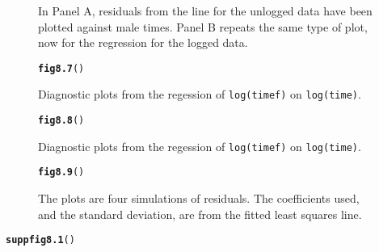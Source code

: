\documentclass[12pt, a4paper,  BCOR=8.25mm, DIV=15]{scrartcl}\usepackage[]{graphicx}\usepackage[]{color}
\makeatletter
\newcommand{\hlstd}[1]{\textcolor[rgb]{0.345,0.345,0.345}{#1}}%
\newcommand{\hlkwd}[1]{\textcolor[rgb]{0.737,0.353,0.396}{\textbf{#1}}}%
\newenvironment{kframe}{%
 \def\at@end@of@kframe{}%
 \ifinner\ifhmode%
  \def\at@end@of@kframe{\end{minipage}}%
  \begin{minipage}{\columnwidth}%
 \fi\fi%
 \def\FrameCommand##1{\hskip\@totalleftmargin \hskip-\fboxsep
 \colorbox{shadecolor}{##1}\hskip-\fboxsep
     \hskip-\linewidth \hskip-\@totalleftmargin \hskip\columnwidth}%
 \MakeFramed {\advance\hsize-\width
   \@totalleftmargin\z@ \linewidth\hsize
   \@setminipage}}%
 {\par\unskip\endMakeFramed%
 \at@end@of@kframe}
\newenvironment{knitrout}{}{} %
\newcommand{\txtt}[1]{{\texttt{#1}}}
\makeatother
\begin{document}
\begin{figure}[H]

\caption{In Panel A, residuals from the line for the unlogged data
  have been plotted against male times.  Panel B repeats the same
  type of plot, now for the regression for the logged data.\label{fig:to-horiz}}
\end{figure}


\begin{figure}[H]
\begin{knitrout}
\color{fgcolor}\begin{kframe}
\begin{alltt}
\hlkwd{fig8.7}\hlstd{()}
\end{alltt}
\end{kframe}
\end{knitrout}
\caption{Diagnostic plots from the regession of \txtt{log(timef)} on
  \txtt{log(time)}.}\label{fig:diag-mftime}
\end{figure}

\begin{figure}[H]
\begin{knitrout}
\color{fgcolor}\begin{kframe}
\begin{alltt}
\hlkwd{fig8.8}\hlstd{()}
\end{alltt}
\end{kframe}
\end{knitrout}
\caption{Diagnostic plots from the regession of \txtt{log(timef)} on
  \txtt{log(time)}.}\label{fig:diag-mftime-log}
\end{figure}

\begin{figure}[H]
\begin{knitrout}
\color{fgcolor}\begin{kframe}
\begin{alltt}
\hlkwd{fig8.9}\hlstd{()}
\end{alltt}
\end{kframe}
\end{knitrout}
\caption{The plots are four simulations of residuals.  The coefficients
  used, and the standard deviation, are from the fitted least squares
  line.\label{fig:4sim-mftimeres1}}
\end{figure}

\begin{suppfigure}[H]
\begin{knitrout}
\color{fgcolor}\begin{kframe}
\begin{alltt}
\hlkwd{suppfig8.1}\hlstd{()}
\end{alltt}
\end{kframe}
\end{knitrout}
\caption{Normal probability plots for four sets of simulated
  data.}\label{fig:mftimesimdiag2}
\end{suppfigure}
\end{document}

